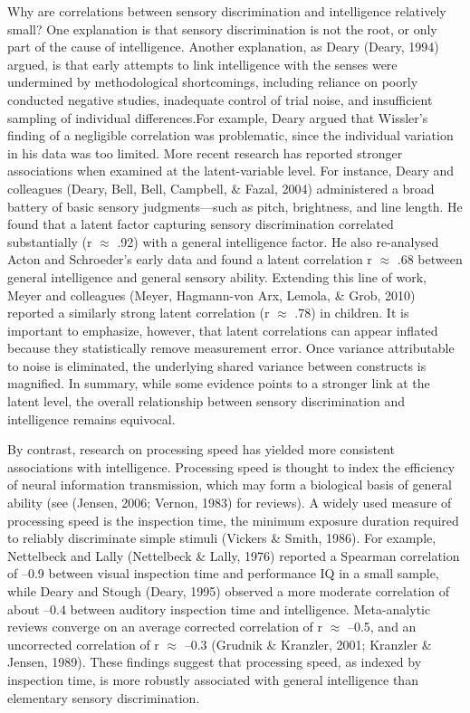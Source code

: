 \documentclass[
  ,man]{apa6}
\begin{document}
Why are correlations between sensory discrimination and intelligence relatively small? One explanation is that sensory discrimination is not the root, or only part of the cause of intelligence. Another explanation, as Deary (Deary, 1994) argued, is that early attempts to link intelligence with the senses were undermined by methodological shortcomings, including reliance on poorly conducted negative studies, inadequate control of trial noise, and insufficient sampling of individual differences.For example, Deary argued that Wissler's finding of a negligible correlation was problematic, since the individual variation in his data was too limited. More recent research has reported stronger associations when examined at the latent-variable level. For instance, Deary and colleagues (Deary, Bell, Bell, Campbell, \& Fazal, 2004) administered a broad battery of basic sensory judgments---such as pitch, brightness, and line length. He found that a latent factor capturing sensory discrimination correlated substantially (r \(\approx\) .92) with a general intelligence factor. He also re-analysed Acton and Schroeder's early data and found a latent correlation r \(\approx\) .68 between general intelligence and general sensory ability. Extending this line of work, Meyer and colleagues (Meyer, Hagmann-von Arx, Lemola, \& Grob, 2010) reported a similarly strong latent correlation (r \(\approx\) .78) in children. It is important to emphasize, however, that latent correlations can appear inflated because they statistically remove measurement error. Once variance attributable to noise is eliminated, the underlying shared variance between constructs is magnified. In summary, while some evidence points to a stronger link at the latent level, the overall relationship between sensory discrimination and intelligence remains equivocal.

By contrast, research on processing speed has yielded more consistent associations with intelligence. Processing speed is thought to index the efficiency of neural information transmission, which may form a biological basis of general ability (see (Jensen, 2006; Vernon, 1983) for reviews). A widely used measure of processing speed is the inspection time, the minimum exposure duration required to reliably discriminate simple stimuli (Vickers \& Smith, 1986). For example, Nettelbeck and Lally (Nettelbeck \& Lally, 1976) reported a Spearman correlation of --0.9 between visual inspection time and performance IQ in a small sample, while Deary and Stough (Deary, 1995) observed a more moderate correlation of about --0.4 between auditory inspection time and intelligence. Meta-analytic reviews converge on an average corrected correlation of r \(\approx\) --0.5, and an uncorrected correlation of r \(\approx\) --0.3 (Grudnik \& Kranzler, 2001; Kranzler \& Jensen, 1989). These findings suggest that processing speed, as indexed by inspection time, is more robustly associated with general intelligence than elementary sensory discrimination.
\end{document}
